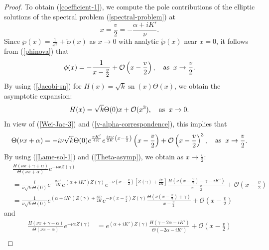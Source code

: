 \documentclass[12pt,reqno]{amsart}
\numberwithin{equation}{section}
\DeclareMathOperator{\sn}{sn}
\begin{document}
\begin{proof}
To obtain (\ref{coefficient-1}), we compute the pole contributions of the elliptic solutions of the spectral problem (\ref{spectral-problem}) at 
$$
x = \frac{v}{2} = -\frac{\alpha + i K'}{\nu}.
$$ 
Since $\wp(x) = \frac{1}{x^2} + \tilde{\wp}(x)$ as $x \to 0$ with analytic  $\tilde{\wp}(x)$ near $x = 0$, it follows from (\ref{phinova}) that 
\begin{equation}
\label{phi-asymp}
\phi(x) = -\frac{1}{x - \frac{v}{2}} + \mathcal{O}\left(x - \frac{v}{2} \right), \quad \mbox{\rm as} \;\; x \to \frac{v}{2}.
\end{equation}
By using (\ref{Jacobi-sn}) for $H(x) = \sqrt{k} \sn(x) \Theta(x)$, we
obtain the asymptotic expansion:
\begin{equation*}
H(x) = \sqrt{k} \Theta(0) x + \mathcal{O}(x^3), \quad \mbox{\rm as} \;\; x \to 0.
\end{equation*}
In view of (\ref{Wei-Jac-3}) and (\ref{v-alpha-correspondence}), this implies that 
\begin{equation}
\label{Theta-asymp}
\Theta(\nu x + \alpha) = -i \nu \sqrt{k} \Theta(0) e^{\frac{\pi K'}{4K}} e^{\frac{i \pi \nu}{2K} \left(x - \frac{v}{2} \right)} \left( x - \frac{v}{2} \right) + \mathcal{O}\left(x - \frac{v}{2} \right)^3, \quad \mbox{\rm as} \;\; x \to \frac{v}{2}.
\end{equation}
By using (\ref{Lame-sol-1}) and (\ref{Theta-asymp}), we obtain as $x \to \frac{v}{2}$:
\begin{align*}
& \frac{H(\nu x + \gamma + \alpha)}{\Theta(\nu x + \alpha)} e^{-\nu x Z(\gamma)}\\
&= \frac{i}{\nu \sqrt{k} \Theta(0)} e^{-\frac{\pi K'}{4K}} 
e^{(\alpha + iK') Z(\gamma)} e^{-\nu \left(x - \frac{v}{2} \right) \left[ Z(\gamma) + \frac{i \pi}{2K}\right]}
\frac{H\left(\nu\left(x - \frac{v}{2}\right) + \gamma - iK' \right)}{x - \frac{v}{2}} + \mathcal{O}\left(x - \frac{v}{2}\right) \\
&= \frac{1}{\nu \sqrt{k} \Theta(0)} 
e^{(\alpha + iK') Z(\gamma) + \frac{i \pi \gamma}{2K}} e^{-\nu \left(x - \frac{v}{2} \right) Z(\gamma)}
\frac{\Theta\left(\nu\left(x - \frac{v}{2}\right) + \gamma \right)}{x - \frac{v}{2}} + \mathcal{O}\left(x - \frac{v}{2}\right)
\end{align*}
and
\begin{align*}
\frac{H(\nu x + \gamma - \alpha)}{\Theta(\nu x - \alpha)} e^{-\nu x Z(\gamma)}
&= e^{(\alpha + iK') Z(\gamma)} \frac{H(\gamma - 2 \alpha - iK')}{\Theta(-2\alpha - iK')} + \mathcal{O}\left(x - \frac{v}{2}\right) \\

\end{align*}
\end{proof}
\end{document}
